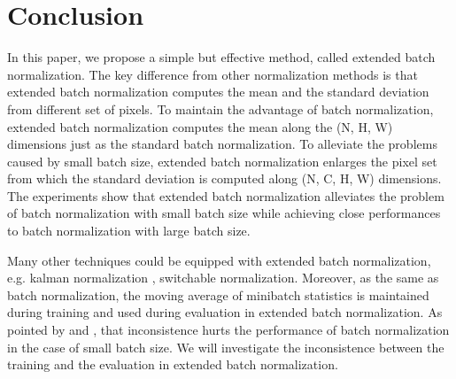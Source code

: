 \documentclass[runningheads]{llncs}
\begin{document}
\section{Conclusion}

In this paper, we propose a simple but effective method, called extended batch normalization. The key difference from other normalization methods is that extended batch normalization computes the mean and the standard deviation from different set of pixels. 
To maintain the advantage of batch normalization, extended batch normalization computes the mean along the (N, H, W) dimensions just as the standard batch normalization. To alleviate the problems caused by small batch size, extended batch normalization enlarges the pixel set from which the standard deviation is computed along (N, C, H, W) dimensions. 
The experiments show that extended batch normalization alleviates the problem of batch normalization with small batch size while achieving close performances to batch normalization with large batch size.

Many other techniques could be equipped with extended batch normalization, e.g. kalman normalization \cite{wang2018kalman}, switchable normalization\cite{luo2018differentiable}.  
Moreover, as the same as batch normalization, the moving average of minibatch statistics is maintained during training and used during evaluation in extended batch normalization.  
As pointed by \cite{ioffe2017batch} and \cite{singh2019evalnorm}, that inconsistence hurts the performance of batch normalization in the case of small batch size. We will investigate the inconsistence between the training and the evaluation in extended batch normalization.

\clearpage


\end{document}
